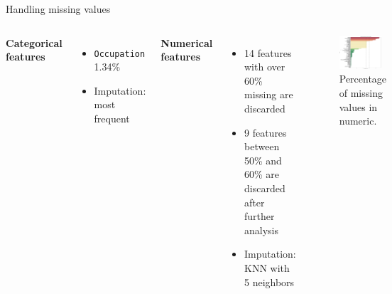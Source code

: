\documentclass[aspectratio=169,xcolor=dvipsnames,handout]{beamer}
\begin{document}

\begin{frame}{Handling missing values}

    \begin{columns}[c]
        \textbf{Categorical features}
        
        \begin{itemize}
            \item \texttt{Occupation} 1.34\%
            \item Imputation: most frequent
        \end{itemize}

        \vspace{0.5cm}
        \pause
        \textbf{Numerical features}

        \begin{itemize}
            \item 14 features with over 60\% missing are discarded
            \item 9 features between 50\% and 60\% are discarded after further analysis
            \item Imputation: KNN with 5 neighbors 
        \end{itemize}

        \begin{figure}[htpb]
            \centering
            \includegraphics[width=0.9\textwidth]{missing_values_percentages.pdf}
            \captionsetup{font=tiny} %
            \caption{Percentage of missing values in numeric.}
        \end{figure}
        
    \end{columns}

\end{frame}
\end{document}
